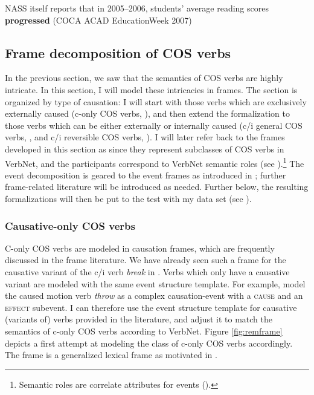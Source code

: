 \begin{exe}
  \ex \label{ex:ext} NASS itself reports that in 2005--2006, students' average reading scores \textbf{progressed}  {\small(\acs{COCA} ACAD EducationWeek 2007)}
\end{exe}

\subsection{Frame decomposition of COS verbs}
\label{sec:cos-input-frames}

In the previous section, we saw that the semantics of COS verbs are highly intricate. 
In this section, I will model these intricacies in frames. 
The section is organized by type of causation: I will start with those verbs which are exclusively externally caused (c-only COS verbs, ), and then extend the formalization to those verbs which can be either externally or internally caused (c/i general COS verbs, , and c/i reversible COS verbs, ). I will later refer back to the frames developed in this section as  since they represent subclasses of COS verbs in VerbNet,  and the participants correspond to VerbNet semantic roles (see ).\footnote{Semantic roles are correlate attributes for events (\citealt[4]{Loebner.toappear}).}
The event decomposition is geared to the event frames as introduced in ; further frame-related literature will be introduced as needed. Further below, the resulting formalizations will then be put to the test with my data set (see ). 

\subsubsection{Causative-only COS verbs} 
\label{sec:cos-input-frames-conly}

C-only COS verbs are modeled in causation frames, which are frequently discussed in the frame literature. We have already seen such a frame for the causative variant of the c/i verb \textit{break} in . Verbs which only have a causative variant are modeled with the same event structure template. For example, \citet[50]{Kallmeyer.2012} model the caused motion verb \textit{throw} as a complex causation-event with a \textsc{cause} and an \textsc{effect} subevent. 
I can therefore use the event structure template for causative (variants of) verbs provided in the literature, and adjust it to match the semantics of c-only COS verbs according to VerbNet.
Figure \ref{fig:remframe} depicts a first attempt at modeling the class of c-only COS verbs accordingly. 
The frame is a generalized lexical frame as motivated in . 

